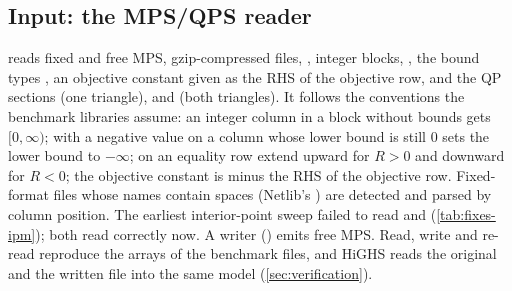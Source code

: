 \subsection{Input: the MPS/QPS reader}
 reads fixed and free MPS, gzip-compressed files, ,
integer  blocks, , the bound types ,
an objective constant given as the RHS of the objective row, and the QP sections 
(one triangle),  and  (both triangles). It follows the conventions the
benchmark libraries assume: an integer column in a  block without bounds gets
$[0,\infty)$;  with a negative value on a column whose lower bound is still $0$ sets
the lower bound to $-\infty$;  on an equality row extend upward for $R>0$ and
downward for $R<0$; the objective constant is minus the RHS of the objective row. Fixed-format
files whose names contain spaces (Netlib's ) are detected and parsed by column
position. The earliest interior-point sweep failed to read  and 
(\cref{tab:fixes-ipm}); both read correctly now. A writer () emits
free MPS. Read, write and re-read reproduce the arrays of the benchmark files, and HiGHS reads the
original and the written file into the same model (\cref{sec:verification}).

